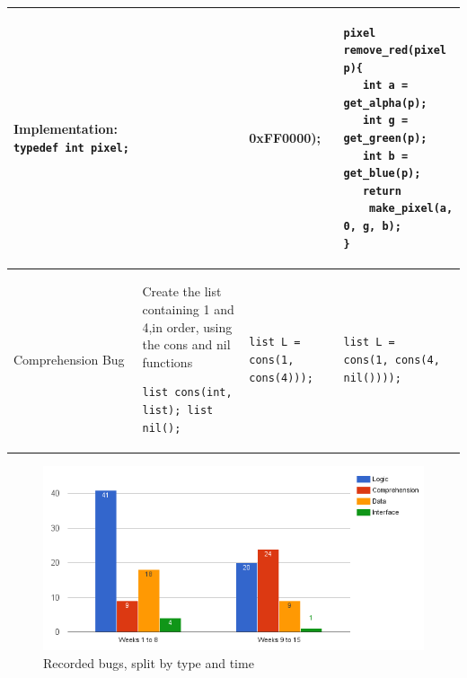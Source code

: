 \documentclass{sig-alternate}
\begin{document}
\begin{table}[t]
\begin{tabular}{|p{0.9in}|p{2.1in}|p{1.7in}|p{1.7in}|}
\textbf{Implementation:} \verb|typedef int pixel;|
\vspace{0.1in}
&
\vspace{-0.2in}
\begin{verbatim}
pixel remove_red(pixel p){
   return (p & 0xFF0000);
}
\end{verbatim}
&
\vspace{-0.2in}
\begin{verbatim}
pixel remove_red(pixel p){
   int a = get_alpha(p);
   int g = get_green(p);
   int b = get_blue(p);
   return
    make_pixel(a, 0, g, b);
}
\end{verbatim}\\
\hline
Comprehension Bug &
Create the list containing 1 and 4,in order, using the cons and nil functions
\begin{verbatim}
list cons(int, list); list nil();
\end{verbatim}
&
\vspace{-0.2in}
\begin{verbatim}
list L = cons(1, cons(4)));
\end{verbatim}
\vspace{-0.2in}
&
\vspace{-0.2in}
\begin{verbatim}
list L =
cons(1, cons(4, nil())));
\end{verbatim}
\vspace{-0.2in}
\\ \hline
\end{tabular}
\end{table}

\begin{figure}
\centering
\includegraphics[scale=0.38]{figures/types.png}
\caption{Recorded bugs, split by type and time}
\label{fig:types}
\end{figure}
\end{document}
